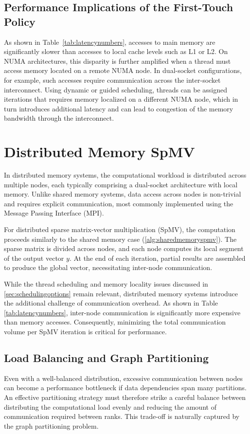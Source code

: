 \subsection{Performance Implications of the First-Touch Policy}
As shown in Table~\ref{tab:latencynumbers}, accesses to main memory are significantly slower than accesses to local cache levels such as L1 or L2. On NUMA architectures, this disparity is further amplified when a thread must access memory located on a remote NUMA node. In dual-socket configurations, for example, such accesses require communication across the inter-socket interconnect. Using dynamic or guided scheduling, threads can be assigned iterations that requires memory localized on a different NUMA node, which in turn introduces additional latency and can lead to congestion of the memory bandwidth through the interconnect.


\section{Distributed Memory SpMV}
In distributed memory systems, the computational workload is distributed across multiple nodes, each typically comprising a dual-socket architecture with local memory. Unlike shared memory systems, data access across nodes is non-trivial and requires explicit communication, most commonly implemented using the Message Passing Interface (MPI).

For distributed sparse matrix-vector multiplication (SpMV), the computation proceeds similarly to the shared memory case (\autoref{alg:sharedmemoryspmv}). The sparse matrix is divided across nodes, and each node computes its local segment of the output vector \(y\). At the end of each iteration, partial results are assembled to produce the global vector, necessitating inter-node communication.

\medskip

While the thread scheduling and memory locality issues discussed in \ref{sec:schedulingoptions} remain relevant, distributed memory systems introduce the additional challenge of communication overhead. As shown in Table \ref{tab:latencynumbers}, inter-node communication is significantly more expensive than memory accesses. Consequently, minimizing the total communication volume per SpMV iteration is critical for performance.


\subsection{Load Balancing and Graph Partitioning}
Even with a well-balanced distribution, excessive communication between nodes can become a performance bottleneck if data dependencies span many partitions. An effective partitioning strategy must therefore strike a careful balance between distributing the computational load evenly and reducing the amount of communication required between ranks. This trade-off is naturally captured by the graph partitioning problem.
\medskip


